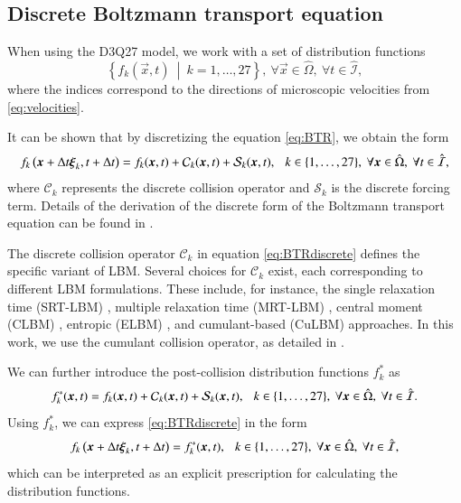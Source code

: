 \subsection{Discrete Boltzmann transport equation}
When using the D3Q27 model, we work with a set of distribution functions
\begin{equation}\label{eq:ddfs}
	\left\{ f_k (\vec{x}, t) \ \middle| \ k = 1, \dots, 27 \right\}, \ \forall \vec{x} \in \hat{\Omega}, \ \forall t \in \hat{\mathcal{I}},
\end{equation}
where the indices correspond to the directions of microscopic velocities from \eqref{eq:velocities}.

It can be shown that by discretizing the equation \eqref{eq:BTR}, we obtain the form
\begin{equation}\label{eq:BTRdiscrete}
	f_{k}\left(\vec{x}+\Delta t \vec{\xi}_{k}, t+\Delta t \right) =
	f_{k}(\vec{x}, t) + \mathcal{C}_{k}(\vec{x}, t) + \mathcal{S}_{k}(\vec{x}, t), \hspace{2.5mm} k \in \{1, \dots, 27 \}, \ \forall \vec{x} \in \hat{\Omega}, \ \forall t \in \hat{\mathcal{I}},
\end{equation}
where $ \mathcal{C}_{k} $ represents the discrete collision operator and $ \mathcal{S}_{k} $ is the discrete forcing term. Details of the derivation of the discrete form of the Boltzmann transport equation can be found in \cite{Kruger}.

The discrete collision operator $\mathcal{C}_{k}$ in equation \eqref{eq:BTRdiscrete} defines the specific variant of LBM. Several choices for $\mathcal{C}_{k}$ exist, each corresponding to different LBM formulations. These include, for instance, the single relaxation time (SRT-LBM) \cite{GeierCuLBM}, multiple relaxation time (MRT-LBM) \cite{MRT}, central moment (CLBM) \cite{GeierCLBM}, entropic (ELBM) \cite{ELBM}, and cumulant-based (CuLBM) \cite{GeierCuLBM} approaches. In this work, we use the cumulant collision operator, as detailed in \cite{GeierCuLBM}.


We can further introduce the post-collision distribution functions $ f^{*}_{k} $ as
\begin{equation}\label{eq:fstar}
	f^{*}_{k}(\vec{x}, t) = f_{k}(\vec{x}, t) + \mathcal{C}_{k}(\vec{x}, t) + \mathcal{S}_{k}(\vec{x}, t), \hspace{2.5mm} k \in \{1, \dots, 27 \}, \ \forall \vec{x} \in \hat{\Omega}, \ \forall t \in \hat{\mathcal{I}}.
\end{equation}
Using $ f^{*}_{k} $, we can express \eqref{eq:BTRdiscrete} in the form
\begin{equation}\label{eq:collision}
	f_{k}\left(\vec{x}+\Delta t \vec{\xi}_{k}, t+\Delta t\right) = f^{*}_{k}(\vec{x}, t), \hspace{2.5mm} k \in \{1, \dots, 27 \}, \ \forall \vec{x} \in \hat{\Omega}, \ \forall t \in \hat{\mathcal{I}},
\end{equation}
which can be interpreted as an explicit prescription for calculating the distribution functions.